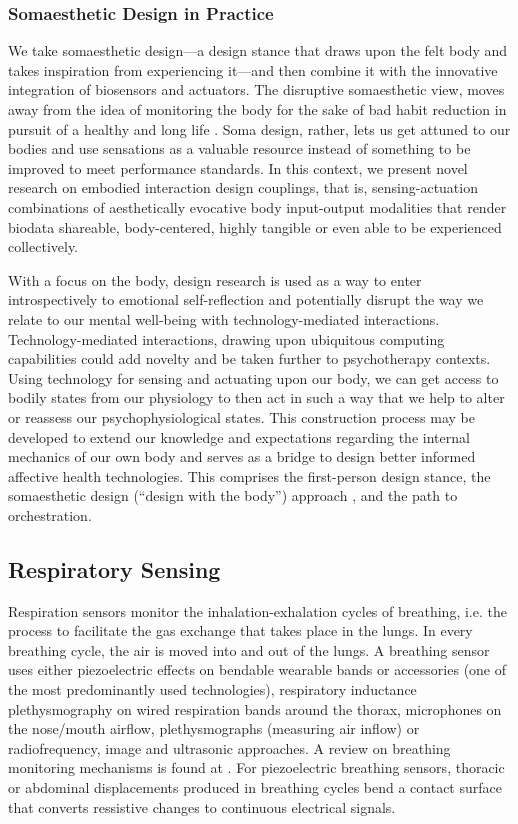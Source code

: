 \subsubsection{Somaesthetic Design in Practice}

We take somaesthetic design—a design stance that draws upon the felt body and takes inspiration from experiencing it—and then combine it with the innovative integration of biosensors and actuators. The disruptive somaesthetic view, moves away from the idea of monitoring the body for the sake of bad habit reduction in pursuit of a healthy and long life \cite{hook_somaesthetic_2015}. Soma design, rather, lets us get attuned to our bodies and use sensations as a valuable resource instead of something to be improved to meet performance standards. In this context, we present novel research on embodied interaction design couplings, that is, sensing-actuation combinations of aesthetically evocative body input-output modalities that render biodata shareable, body-centered, highly tangible or even able to be experienced collectively.

With a focus on the body, design research is used as a way to enter introspectively to emotional self-reflection and potentially disrupt the way we relate to our mental well-being with technology-mediated interactions. Technology-mediated interactions, drawing upon ubiquitous computing capabilities could add novelty and be taken further to psychotherapy contexts. Using technology for sensing and actuating upon our body, we can get access to bodily states from our physiology to then act in such a way that we help to alter or reassess our psychophysiological states. This construction process may be developed to extend our knowledge and expectations regarding the internal mechanics of our own body and serves as a bridge to design better informed affective health technologies. This comprises the first-person design stance, the somaesthetic design (“design with the body”) approach \cite{hook_designing_2018}, and the path to orchestration.

\subsection{Respiratory Sensing}

Respiration sensors monitor the inhalation-exhalation cycles of breathing, i.e. the process to facilitate the gas exchange that takes place in the lungs. In every breathing cycle, the air is moved into and out of the lungs. A breathing sensor uses either piezoelectric effects on bendable wearable bands or accessories (one of the most predominantly used technologies), respiratory inductance plethysmography on wired respiration bands around the thorax, microphones on the nose/mouth airflow, plethysmographs (measuring air inflow) or radiofrequency, image and ultrasonic approaches. A review on breathing monitoring mechanisms is found at \cite{massaroni_contact-based_2019}. For piezoelectric breathing sensors, thoracic or abdominal displacements produced in breathing cycles bend a contact surface that converts ressistive changes to continuous electrical signals.

